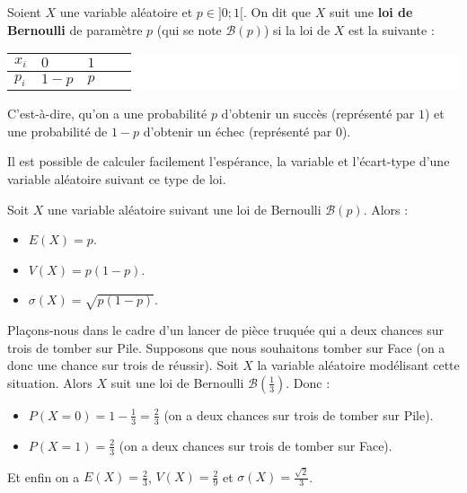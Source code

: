 	\begin{formula}[Définition]
		Soient $X$ une variable aléatoire et $p \in ]0; 1[$. On dit que $X$ suit une \textbf{loi de Bernoulli} de paramètre $p$ (qui se note $\mathcal{B}(p)$) si la loi de $X$ est la suivante :
		\newpar
		\colorbox{white}{%
			\begin{tabularx}{\textwidth}{|X|X|X|X|X|}
				\hline
				$x_i$ & $0$ & $1$ \\
				\hline
				$p_i$ & $1 - p$ & $p$ \\
				\hline
			\end{tabularx}%
		}
		\newpar
		C'est-à-dire, qu'on a une probabilité $p$ d'obtenir un succès (représenté par $1$) et une probabilité de $1-p$ d'obtenir un échec (représenté par $0$).
	\end{formula}

	Il est possible de calculer facilement l'espérance, la variable et l'écart-type d'une variable aléatoire suivant ce type de loi.

	\begin{formula}
		Soit $X$ une variable aléatoire suivant une loi de Bernoulli $\mathcal{B}(p)$. Alors :
		\begin{itemize}
			\item $E(X) = p$.
			\item $V(X) = p(1-p)$.
			\item $\sigma(X) = \sqrt{p(1-p)}$.
		\end{itemize}
	\end{formula}

	\begin{tip}[Exemple]
		Plaçons-nous dans le cadre d'un lancer de pièce truquée qui a deux chances sur trois de tomber sur Pile. Supposons que nous souhaitons tomber sur Face (on a donc une chance sur trois de réussir).
		\newpar
		Soit $X$ la variable aléatoire modélisant cette situation. Alors $X$ suit une loi de Bernoulli $\mathcal{B}\left(\frac{1}{3}\right)$. Donc :
		\begin{itemize}
			\item $P(X = 0) = 1 - \frac{1}{3} = \frac{2}{3}$ (on a deux chances sur trois de tomber sur Pile).
			\item $P(X = 1) = \frac{2}{3}$ (on a deux chances sur trois de tomber sur Face).
		\end{itemize}
		Et enfin on a $E(X) = \frac{2}{3}$, $V(X) = \frac{2}{9}$ et $\sigma(X) = \frac{\sqrt{2}}{3}$.
	\end{tip}


